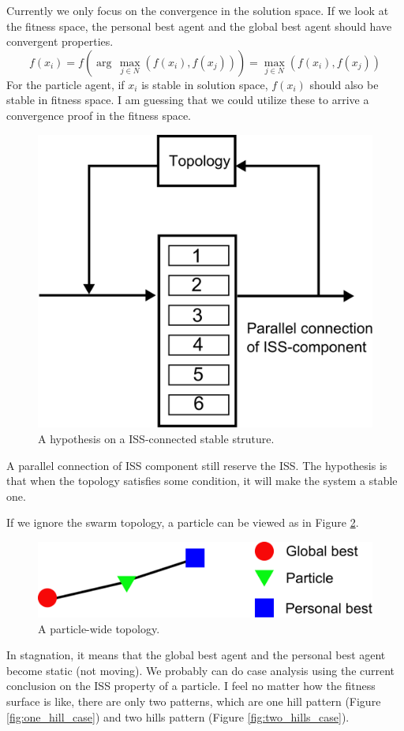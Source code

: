 \documentclass[10pt,a4paper]{article}
\begin{document}
Currently we only focus on the convergence in the solution space.
If we look at the fitness space, the personal best agent and the global best agent should have convergent properties.
\begin{equation}
f( x_{i} ) = f( \arg \, \max_{ j \in N } ( f( x_{i} ) , f( x_{j} ) ) ) = \max_{ j \in N } ( f( x_{i} ) , f( x_{j} ) )
\end{equation}
For the particle agent, if $ x_{i} $ is stable in solution space, $ f( x_{i} ) $ should also be stable in fitness space.
I am guessing that we could utilize these to arrive a convergence proof in the fitness space.

\begin{figure}
\centering
\includegraphics[width=0.6\linewidth]{./iss_structure}
\caption{A hypothesis on a ISS-connected stable struture.}
\label{fig:iss_structure}
\end{figure}

A parallel connection of ISS component still reserve the ISS.
The hypothesis is that when the topology satisfies some condition, it will make the system a stable one.

If we ignore the swarm topology, a particle can be viewed as in Figure \ref{fig:particle_topology}.

\begin{figure}
\centering
\includegraphics[width=0.7\linewidth]{./particle_topology}
\caption{A particle-wide topology.}
\label{fig:particle_topology}
\end{figure}

In stagnation, it means that the global best agent and the personal best agent become static (not moving).
We probably can do case analysis using the current conclusion on the ISS property of a particle.
I feel no matter how the fitness surface is like, there are only two patterns, which are one hill pattern (Figure \ref{fig:one_hill_case}) and two hills pattern (Figure \ref{fig:two_hills_case}).
\end{document}
